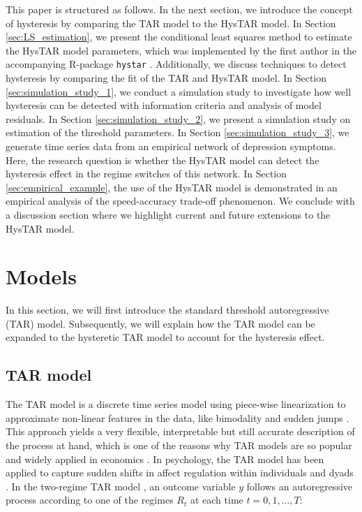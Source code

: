 \documentclass{article}
\begin{document}
This paper is structured as follows.
In the next section, we introduce the concept of hysteresis by comparing the TAR model to the HysTAR model.
In Section \ref{sec:LS_estimation}, we present the conditional least squares method to estimate the HysTAR model parameters, which was implemented by the first author in the accompanying \textsf{R}-package \texttt{hystar} \citep{R, R_hystar}. 
Additionally, we discuss techniques to detect hysteresis by comparing the fit of the TAR and HysTAR model.
In Section \ref{sec:simulation_study_1}, we conduct a simulation study to investigate how well hysteresis can be detected with information criteria and analysis of model residuals.
In Section \ref{sec:simulation_study_2}, we present a simulation study on estimation of the threshold parameters.
In Section \ref{sec:simulation_study_3}, we generate time series data from an empirical network of depression symptoms. Here, the research question is whether the HysTAR model can detect the hysteresis effect in the regime switches of this network.
In Section \ref{sec:empirical_example}, the use of the HysTAR model is demonstrated in an empirical analysis of the speed-accuracy trade-off phenomenon.
We conclude with a discussion section where we highlight current and future extensions to the HysTAR model.

\section{Models} \label{sec:hystar}
In this section, we will first introduce the standard threshold autoregressive (TAR) model.
Subsequently, we will explain how the TAR model can be expanded to the hysteretic TAR model to account for the hysteresis effect.

\subsection{TAR model}
The TAR model is a discrete time series model using piece-wise linearization to approximate non-linear features in the data, like bimodality and sudden jumps \citep{tar}.
This approach yields a very flexible, interpretable but still accurate description of the process at hand, which is one of the reasons why TAR models are so popular and widely applied in economics \citep{tar_in_economics}.
In psychology, the TAR model has been applied to capture sudden shifts in affect regulation within individuals \citep{tar_affect_person1, tar_affect_person2} and dyads \citep{tar_affect_dyadic1, tar_affect_dyadic2}.
In the two-regime TAR model \citet{tar}, an outcome variable $y$ follows an autoregressive process according to one of the regimes $R_t$ at each time $t = 0, 1, \dots, T$:
\end{document}
